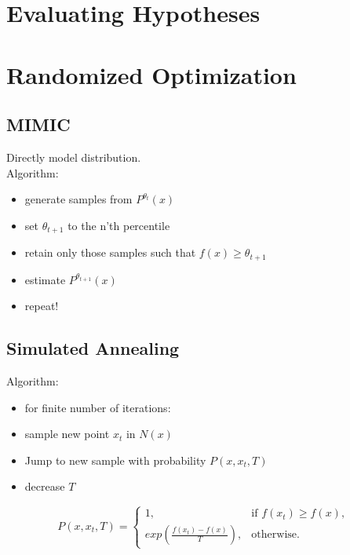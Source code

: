 \documentclass[titlepage,11pt]{article}
\begin{document}
\section{Evaluating Hypotheses}

\section{Randomized Optimization}
\subsection{MIMIC}
Directly model distribution.\\
Algorithm:\\
\begin{itemize}
\item generate samples from $P^{\theta_t}(x)$
\item set $\theta_{t+1}$ to the n'th percentile
\item retain only those samples such that $f(x) \geq \theta_{t+1}$
\item estimate $P^{\theta_{t+1}}(x)$
\item repeat!
\end{itemize}

\subsection{Simulated Annealing}
Algorithm:\\
\begin{itemize}
\item for finite number of iterations:
\item sample new point $x_t$ in $N(x)$
\item Jump to new sample with probability $P(x, x_t, T)$
\item decrease $T$
\end{itemize}
$$P(x, x_t, T) =
    \begin{cases}
            1, &         \text{if } f(x_t) \geq f(x),\\
            exp(\frac{f(x_t)-f(x)}{T}), &         \text{otherwise}.
    \end{cases}
$$
\end{document}
